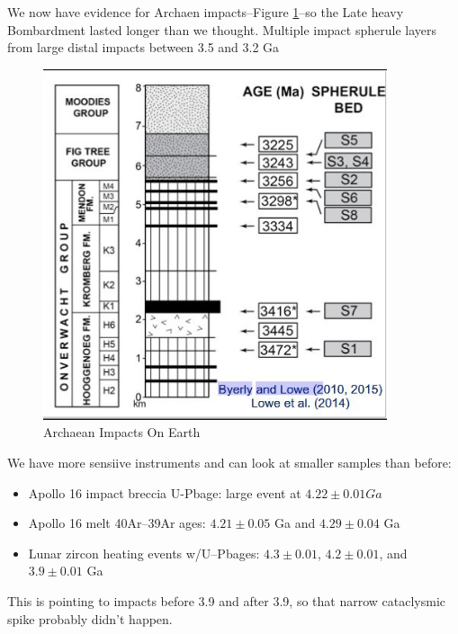 \documentclass[]{article}
\begin{document}
We now have evidence for Archaen impacts--Figure \ref{fig:ArchaeanImpactsOnEarth}--so the Late heavy Bombardment lasted longer than we thought. Multiple impact spherule layers from large distal impacts between 3.5 and 3.2 Ga
 
\begin{figure}[H]
	\caption{Archaean Impacts On Earth}\label{fig:ArchaeanImpactsOnEarth}
	\includegraphics[width=0.9\textwidth]{ArchaeanImpactsOnEarth}
\end{figure}

We have more sensiive instruments and can look at smaller samples than before:
\begin{itemize}
	\item Apollo 16 impact breccia U-Pbage: large event at $4.22\pm0.01Ga$ 
	\item Apollo 16 melt 40Ar–39Ar ages: $4.21\pm0.05$ Ga and  $4.29\pm0.04$ Ga
	\item Lunar zircon heating events w/U–Pbages:  $4.3\pm0.01$,  $4.2\pm0.01$, and  $3.9\pm0.01$ Ga
\end{itemize}

This is pointing to impacts before 3.9 and after 3.9, so that narrow cataclysmic spike probably didn't happen.
\end{document}
